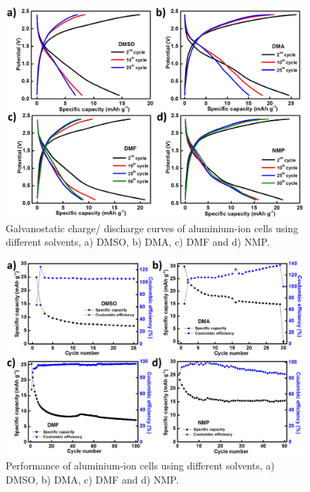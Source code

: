 \begin{figure}[tbh!]
\centering
\includegraphics[width=\textwidth]{Figures/chap7fig/hBNsolventCDC}
\caption{Galvanostatic charge/ discharge curves of aluminium-ion cells using different solvents, a) DMSO, b) DMA, c) DMF and d) NMP.}
\label{Figures/chap7fig:hBNsolventCDC}
\end{figure}

\begin{figure}[tbh!]
\centering
\includegraphics[width=\textwidth]{Figures/chap7fig/hBNsolventCE}
\caption{Performance of aluminium-ion cells using different solvents, a) DMSO, b) DMA, c) DMF and d) NMP.}
\label{Figures/chap7fig:hBNsolventCE}
\end{figure}

